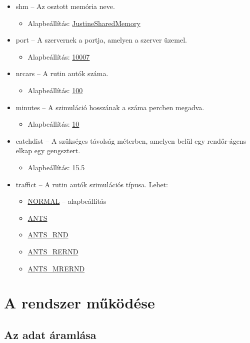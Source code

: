 \documentclass[a4paper,12pt]{report}
\begin{document}
\begin{itemize}
\item shm -- Az osztott memória neve.
	\begin{itemize}
	\item Alapbeállítás: \url{JustineSharedMemory}
	\end{itemize}
\item port -- A szervernek a portja, amelyen a szerver üzemel.
	\begin{itemize}
	\item Alapbeállítás: \url{10007}
	\end{itemize}
\item nrcars -- A rutin autók száma.
	\begin{itemize}
	\item Alapbeállítás: \url{100}
	\end{itemize}
\item minutes -- A szimuláció hosszának a száma percben megadva.
	\begin{itemize}
	\item Alapbeállítás: \url{10}
	\end{itemize}
\item catchdist -- A szükséges távolság méterben, amelyen belül egy rendőr-ágens elkap egy gengsztert.
	\begin{itemize}
	\item Alapbeállítás: \url{15.5}
	\end{itemize}
\item traffict -- A rutin autók szimulációs típusa. Lehet:
	\begin{itemize}
	\item \url{NORMAL} -- alapbeállítás
	\item \url{ANTS}
	\item \url{ANTS_RND}
	\item \url{ANTS_RERND}
	\item \url{ANTS_MRERND}
	\end{itemize}
\end{itemize}

\section{A rendszer működése}

\subsection{Az adat áramlása}
\label{dataflow}
\end{document}
